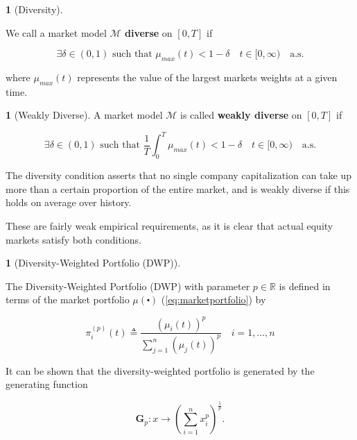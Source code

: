 \documentclass[british]{amsart}
\numberwithin{equation}{section}
\numberwithin{figure}{section}
\theoremstyle{plain}
\theoremstyle{definition}
\newtheorem{defn}[thm]{\protect\definitionname}
\theoremstyle{plain}
\theoremstyle{plain}
\theoremstyle{plain}
\theoremstyle{remark}
\theoremstyle{plain}
\providecommand{\definitionname}{Definition}
\newcommand{\ranget}{t\in[0,\infty)}
\newcommand{\almostsurely}{\text{a.s.}}
\newcommand{\rangei}{i=1,\dots,n}
\begin{document}
\begin{defn} [Diversity]
	\label{def:diversity}

	We call a market model \textbf{$\mathcal{M}$ diverse }on $[0,T]$ if 

	\begin{equation}
		\exists \delta \in(0,1) \text{ such that }
			\mu_{max}(t)<1-\delta
		\quad \ranget
		\quad \almostsurely
	\end{equation}

	where $\mu_{max}(t)$ represents the value of the largest markets weights at a given time. 

\end{defn}

\begin{defn} [Weakly Diverse]
	A market model\textbf{ $\mathcal{M}$} is called \textbf{weakly diverse} on $[0,T]$ if 

	\begin{equation}
		\exists \delta \in(0,1) \text{ such that }
			\frac{1}{T} \int_{0}^{T} \mu_{max}(t) < 1-\delta
		\quad \ranget
		\quad \almostsurely
	\end{equation}

\end{defn}

The diversity condition asserts that no single company capitalization can take up more than a certain proportion of the entire market, and is weakly diverse if this holds on average over history.

These are fairly weak empirical requirements, as it is clear that actual equity markets satisfy both conditions.

\begin{defn} [Diversity-Weighted Portfolio (DWP)] 
	\label{defn:diversityweightedportfolio}

	The Diversity-Weighted Portfolio (DWP) with parameter $p\in\mathbb{R}$ is defined in terms of the market portfolio $\mu(\centerdot)$ (\ref{eq:marketportfolio}) by

	\begin{equation}
		\label{eq:diversityweightedportfolio}
		\pi_{i}^{(p)}(t) \triangleq 
				\frac{\left( \mu_{i}(t) \right)^{p}} {\sum_{j=1}^{n} \left( \mu_{j}(t) \right)^{p} }
		\quad \rangei
	\end{equation}
\end{defn}

It can be shown that the diversity-weighted portfolio is generated by the generating function

	\begin{equation}
		\mathbf{G}_{p}:x\to\left(\sum_{i=1}^{n}x_{i}^{p}\right)^{\frac{1}{p}}.
	\end{equation}
\end{document}

